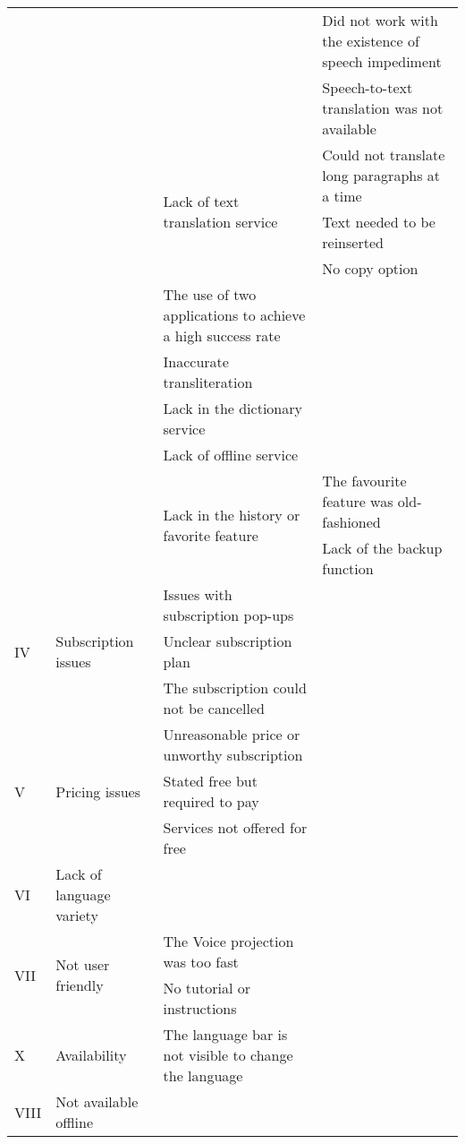 \documentclass[english]{textolivre}
\begin{document}
\begin{longtable}{p{1cm} p{2.5cm} p{4.5cm} p{5cm}}
& & & Did not work with the existence of speech impediment \\
& & & Speech-to-text translation was not available \\
\cmidrule{3-4}
& & \multirow{3}{=}{Lack of text translation service} & Could not translate long paragraphs at a time \\
& & & Text needed to be reinserted \\
& & & No copy option \\
\cmidrule{3-4}
& & The use of two applications to achieve a high success rate & \cellcolor[HTML]{EFEFEF} \\
\cmidrule{3-4}
& & Inaccurate transliteration & \cellcolor[HTML]{EFEFEF} \\
\cmidrule{3-4}
& & Lack in the dictionary service & \cellcolor[HTML]{EFEFEF} \\
\cmidrule{3-4}
& & Lack of offline service & \cellcolor[HTML]{EFEFEF} \\
\cmidrule{3-4}
& & \multirow{2}{=}{Lack in the history or favorite feature} & The favourite feature was old-fashioned \\
& & & Lack of the backup function \\
\midrule
\multirow{3}{=}{IV} & \multirow{3}{=}{Subscription issues} & Issues with subscription pop-ups & \cellcolor[HTML]{EFEFEF} \\
& & Unclear subscription plan & \cellcolor[HTML]{EFEFEF} \\
& & The subscription could not be cancelled & \cellcolor[HTML]{EFEFEF} \\
\midrule
\multirow{3}{=}{V} & \multirow{3}{=}{Pricing issues} & Unreasonable price or unworthy subscription & \cellcolor[HTML]{EFEFEF} \\
& & Stated free but required to pay & \cellcolor[HTML]{EFEFEF} \\
& & Services not offered for free & \cellcolor[HTML]{EFEFEF} \\
\midrule
VI & Lack of language variety & \cellcolor[HTML]{EFEFEF} & \cellcolor[HTML]{EFEFEF} \\
\midrule
\multirow{2}{=}{VII} & \multirow{2}{=}{Not user friendly} & The Voice projection was too fast & \cellcolor[HTML]{EFEFEF} \\ 
\cmidrule{3-4}
& & No tutorial or instructions & \cellcolor[HTML]{EFEFEF} \\
\midrule
X & Availability & The language bar is not visible to change the language & \cellcolor[HTML]{EFEFEF} \\
\midrule
VIII & Not available offline & \cellcolor[HTML]{EFEFEF} & \cellcolor[HTML]{EFEFEF} \\

\end{longtable}
\end{document}
